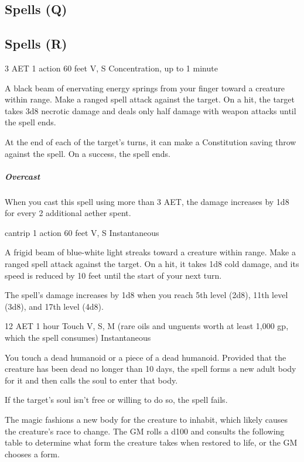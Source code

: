 \subsection{Spells (Q)}

\subsection{Spells (R)}

{3 AET}
{1 action}
{60 feet}
{V, S}
{Concentration, up to 1 minute}

A black beam of enervating energy springs from your finger toward a creature within range. Make a ranged spell attack against the target. On a hit, the target takes 3d8 necrotic damage and deals only half damage with weapon attacks until the spell ends.

At the end of each of the target's turns, it can make a Constitution saving throw against the spell. On a success, the spell ends.

\subparagraph*{Overcast} When you cast this spell using more than 3 AET, the damage increases by 1d8 for every 2 additional aether spent.


{cantrip}
{1 action}
{60 feet}
{V, S}
{Instantaneous}

A frigid beam of blue-white light streaks toward a creature within range. Make a ranged spell attack against the target. On a hit, it takes 1d8 cold damage, and its speed is reduced by 10 feet until the start of your next turn.

The spell's damage increases by 1d8 when you reach 5th level (2d8), 11th level (3d8), and 17th level (4d8).


{12 AET}
{1 hour}
{Touch}
{V, S, M (rare oils and unguents worth at least 1,000 gp, which the spell consumes)}
{Instantaneous}

You touch a dead humanoid or a piece of a dead humanoid. Provided that the creature has been dead no longer than 10 days, the spell forms a new adult body for it and then calls the soul to enter that body.

If the target's soul isn't free or willing to do so, the spell fails.

The magic fashions a new body for the creature to inhabit, which likely causes the creature's race to change. The GM rolls a d100 and consults the following table to determine what form the creature takes when restored to life, or the GM chooses a form.

